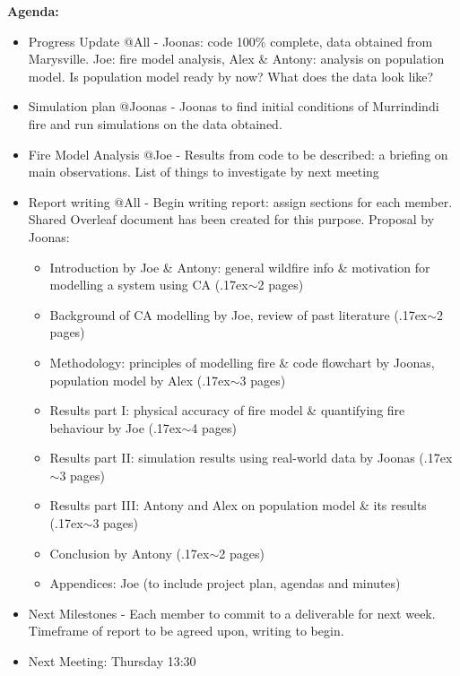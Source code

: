 \noindent \textbf{Agenda:}
\begin{itemize}
    \item Progress Update @All - Joonas: code 100\% complete, data obtained from Marysville. Joe: fire model analysis, Alex \& Antony: analysis on population model. Is population model ready by now? What does the data look like?
    \item Simulation plan @Joonas - Joonas to find initial conditions of Murrindindi fire and run simulations on the data obtained.
    \item Fire Model Analysis @Joe - Results from code to be described: a briefing on main observations. List of things to investigate by next meeting
    \item Report writing @All - Begin writing report: assign sections for each member. Shared Overleaf document has been created for this purpose. Proposal by Joonas: \begin{itemize}
        \item Introduction by Joe \& Antony: general wildfire info \& motivation for modelling a system using CA ({\raise.17ex\hbox{$\scriptstyle\sim$}}2 pages)
        \item Background of CA modelling by Joe, review of past literature ({\raise.17ex\hbox{$\scriptstyle\sim$}}2 pages)
        \item Methodology: principles of modelling fire \& code flowchart by Joonas, population model by Alex ({\raise.17ex\hbox{$\scriptstyle\sim$}}3 pages)
        \item Results part I: physical accuracy of fire model \& quantifying fire behaviour by Joe ({\raise.17ex\hbox{$\scriptstyle\sim$}}4 pages)
        \item Results part II: simulation results using real-world data by Joonas ({\raise.17ex\hbox{$\scriptstyle\sim$}}3 pages)
        \item Results part III: Antony and Alex on population model \& its results ({\raise.17ex\hbox{$\scriptstyle\sim$}}3 pages)
        \item Conclusion by Antony ({\raise.17ex\hbox{$\scriptstyle\sim$}}2 pages)
        \item Appendices: Joe (to include project plan, agendas and minutes)
    \end{itemize}
    \item Next Milestones - Each member to commit to a deliverable for next week. Timeframe of report to be agreed upon, writing to begin.
    \item Next Meeting: Thursday 13:30
\end{itemize}
